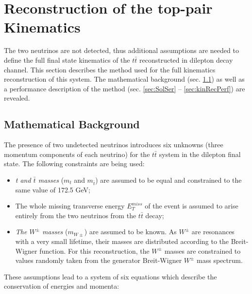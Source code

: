 \chapter{Reconstruction of the top-pair Kinematics}\label{chapt:kinReco}

The two neutrinos are not detected, thus additional
assumptions are needed to define the full final state kinematics of the $t\bar{t}$ reconstructed in dilepton decay channel.
This section describes the method used for the full kinematics reconstruction of this system. The mathematical
background (sec. \ref{sec:MatBg}) as well as a performance description of the method (sec. \ref{sec:SolSer} -- \ref{sec:kinRecPerf}) are revealed.

\section{Mathematical Background}\label{sec:MatBg}

The presence of two undetected neutrinos introduces six unknowns  (three momentum components of each neutrino)
for the $t\bar{t}$ system in the dilepton final state.
The following constraints are being used:

\begin{itemize}
 \item \textit{t and $\bar{t}$ masses} ($m_{t}$ and $m_ {\bar{t}}$) are assumed to be equal and constrained to the same value of 172.5 GeV\cite{PDG-2012};
 \item The whole missing transverse energy $E_{T}^{miss}$ of the event is assumed to arise entirely
 from the two neutrinos from the $t\bar{t}$ decay;
 \item \textit{The $W^{\pm}$ masses} ($m_{W\pm}$) are assumed to be known. As $W^{\pm}$ are resonances with a very small lifetime, their masses 
 are distributed according to the Breit-Wigner function. For this reconstruction, the $W^{\pm}$ masses are constrained to values randomly taken 
 from the generator Breit-Wigner $W^{\pm}$ mass spectrum.
\end{itemize}

These assumptions lead to a system of six equations which describe the conservation of energies and momenta:

